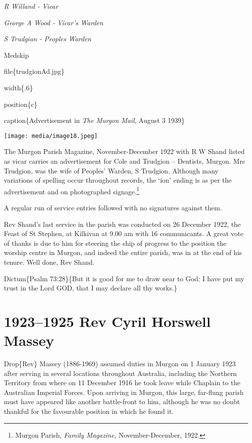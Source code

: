 \emph{R Willand - Vicar}

\emph{George A Wood - Vicar's Warden}

\emph{S Trudgian - Peoples Warden}

Medskip

file\{trudgionAd.jpg\}

width\{.6\}

position\{c\}

caption\{Advertisement in \emph{The Murgon Mail}, August 3 1939\}

\texttt{[image: media/image18.jpeg]}

The Murgon Parish Magazine, November-December 1922 with R W Shand listed as vicar carries an advertisement for Cole and Trudgion -- Dentists, Murgon. Mrs Trudgion, was the wife of Peoples' Warden, S Trudgion. Although many variations of spelling occur throughout records, the `ion' ending is as per the advertisement and on photographed signage.\footnote{Murgon Parish, \emph{Family Magazine,} November-December, 1922.}

A regular run of service entries followed with no signatures against them.

Rev Shand's last service in the parish was conducted on 26 December 1922, the Feast of St Stephen, at Kilkivan at 9.00 am with 16 communicants. A great vote of thanks is due to him for steering the ship of progress to the position the worship centre in Murgon, and indeed the entire parish, was in at the end of his tenure. Well done, Rev Shand.

\begin{quote}
\end{quote}

Dictum\{Psalm 73:28\}\{But it is good for me to draw near to God: I have put my trust in the Lord GOD, that I may declare all thy works.\}

\hypertarget{rev-cyril-horswell-massey}{%
\chapter{1923--1925 Rev Cyril Horswell Massey}\label{rev-cyril-horswell-massey}}

Drop\{Rev\} Massey (1886-1969) assumed duties in Murgon on 1 January 1923 after serving in several locations throughout Australia, including the Northern Territory from where on 11 December 1916 he took leave while Chaplain to the Australian Imperial Forces. Upon arriving in Murgon, this large, far-flung parish must have appeared like another battle-front to him, although he was no doubt thankful for the favourable position in which he found it.

